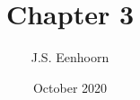 \documentclass{article}
\title{Chapter 3}
\author{J.S. Eenhoorn}
\date{October 2020}
\newcommand{\be}{\begin{equation}}
\newcommand{\ee}{\end{equation}}
\newcommand{\R}{\mathbb{R}}
\newcommand{\diff}{\mathop{}\!\mathrm{d}}
\numberwithin{equation}{section}
\begin{document}
\maketitle
\begin{comment}
\section{Original: Uniqueness of the Ground State Solution for $\Delta u - u + u^3 = 0$ and a Variational Characterization of Other Solutions}
\begin{outline}
\1 Introduction
    \2 It is known that \be \Delta u - u + u^3 = 0 \ee in $\R^3$ has a positive radially symmetric solution $u=\phi_1\in C^2\cap L^4$.
    \2 In this note we show that $\phi_1$ is unique. That is, there is precisely one positive radially symmetric solution of \eqref{upde} which belongs to $C^2\cap L^4$.
    \2 Moreover, we show that for $u\in H^1$, $u\neq 0$ \be J(\phi_1) < J(u)\ee unless \be \label{utrans} u(x) = \lambda \phi_1(x+x_0) \ee for some non-zero real $\lambda$ and $x_0\in \R^3$.
    \2 Here $J$ is the Rayleigh quotient associated with \eqref{upde}, \be \label{rqdef} J(u) = \frac{\left(\int \vert \mathrm{grad}\ u\vert^2 + u^2)\diff x\right)^2}{\int u^4 \diff x} \ee
    \2 The expression on the right of \eqref{rqdef} is meaningful for $u\in H^1$, $u\neq0$; such functions will henceforth be referred to as \emph{admissible} functions.
    \2 The equation \eqref{upde} is considered in Finklestein 1951, where it is asserted that there exist function $v_n(r) \in C^2(\left[0, \infty\right))$, $n=1, 2, \ldots$, such that for each $n$, $v_n$ has exactly $n-1$ isolated zeroes in $\left[0, \infty\right)$, decays exponentially for $r\to\infty$, and $\phi_n(x) = v_n(|x|)$ is a solution of \eqref{upde}.
    \2 A rigorous proof of existence of $v_1$ was given by Nehari 1963; the proof of existence of $v_n$, $n\geq 1$, was given by Ryder 1967. Berger 1970 has proved the same results using the Lyusternik-Schnirelman theory.
    \2 We have proved the main result of this note in order to answer some questions which are raised in Robinson 1971, but are not satisfactorily answered there. We also demonstrate the equivalence of several variational characterizations of the non-positive radially symmetric solutions \eqref{upde}.
\1 Preliminaries
    \2 We seek solutions to \eqref{upde} subject to the "boundary condition at infinity" \be \label{ubc} u \in L^4 \ee.

\end{comment}
\end{document}
